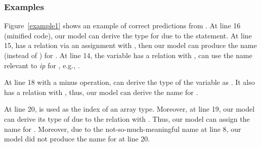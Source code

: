 \subsubsection{Examples}
\label{sec:eval-example}

Figure~\ref{example1} shows an example of correct predictions from
{\tool}.  At line 16 (minified code), our model can derive the
type  for  due to the  statement. At line
15,  has a relation via an assignment
with , then our model can produce the
name  (instead of ) for . At
line 14, the variable  has a relation
with , {\tool} can use the name relevant to
{\em ip} for , e.g., .

At line 18 with a minus operation, {\tool} can derive the type of the
variable  as . It also has a relation
with , thus, our model
can derive the name  for .

At line 20,  is used as the index of an array type.
Moreover, at line 19, our model can derive its type of 
due to the relation with . Thus, our model
can assign the name  for . Moreover,
due to the not-so-much-meaningful name  at line 8,
our model did not produce the name for  at line 20.


